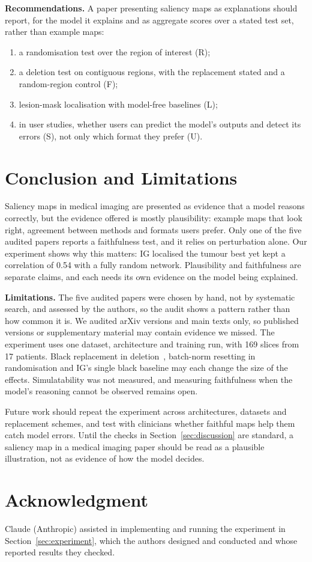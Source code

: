 \documentclass[conference]{IEEEtran}
\renewcommand{\cite}{\citep}
\begin{document}
\textbf{Recommendations.} A paper presenting saliency maps as explanations should report, for the model it explains and as aggregate scores over a stated test set, rather than example maps:
\begin{enumerate}
\item a randomisation test over the region of interest (R);
\item a deletion test on contiguous regions, with the replacement stated and a random-region control (F);
\item lesion-mask localisation with model-free baselines (L);
\item in user studies, whether users can predict the model's outputs and detect its errors (S), not only which format they prefer (U).
\end{enumerate}

\section{Conclusion and Limitations}
\label{sec:conclusion}
Saliency maps in medical imaging are presented as evidence that a model reasons correctly, but the evidence offered is mostly plausibility: example maps that look right, agreement between methods and formats users prefer. Only one of the five audited papers reports a faithfulness test, and it relies on perturbation alone. Our experiment shows why this matters: IG localised the tumour best yet kept a correlation of 0.54 with a fully random network. Plausibility and faithfulness are separate claims, and each needs its own evidence on the model being explained.

\textbf{Limitations.} The five audited papers were chosen by hand, not by systematic search, and assessed by the authors, so the audit shows a pattern rather than how common it is. We audited arXiv versions and main texts only, so published versions or supplementary material may contain evidence we missed. The experiment uses one dataset, architecture and training run, with 169 slices from 17 patients. Black replacement in deletion~\cite{hooker2019roar}, batch-norm resetting in randomisation and IG's single black baseline may each change the size of the effects. Simulatability was not measured, and measuring faithfulness when the model's reasoning cannot be observed remains open.

Future work should repeat the experiment across architectures, datasets and replacement schemes, and test with clinicians whether faithful maps help them catch model errors. Until the checks in Section~\ref{sec:discussion} are standard, a saliency map in a medical imaging paper should be read as a plausible illustration, not as evidence of how the model decides.

\section*{Acknowledgment}
Claude (Anthropic) assisted in implementing and running the experiment in Section~\ref{sec:experiment}, which the authors designed and conducted and whose reported results they checked.

\clearpage
\renewcommand{\bibfont}{\footnotesize}


\end{document}
